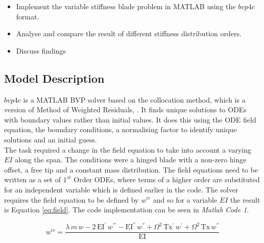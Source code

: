 \documentclass[11pt]{article}
\newcommand*{\lstconsolas}{\fontfamily{Consolas}\selectfont}
\begin{document}
\begin{itemize}
\itemsep0em
    \item Implement the variable stiffness blade problem in MATLAB using the $bvp4c$ format.
    \item Analyse and compare the result of different stiffness distribution orders.
    \item Discuss findings
\end{itemize}

\subsection{Model Description}
$bvp4c$ is a MATLAB BVP solver based on the collocation method, which is a version of Method of Weighted Residuals, \cite{bvp}. It finds unique solutions to ODEs with boundary values rather than initial values. It does this using the ODE field equation, the boundary conditions, a normalising factor to identify unique solutions and an initial guess.\\
The task required a change in the field equation to take into account a varying $EI$ along the span. The conditions were a hinged blade with a non-zero hinge offset, a free tip and a constant mass distribution.
The field equations need to be written as a set of $1^{st}$ Order ODEs, where terms of a higher order are substituted for an independent variable which is defined earlier in the code.
The solver requires the field equation to be defined by $w^{iv}$ and so for a variable $EI$ the result is Equation \ref{eq:field}. The code implementation can be seen in \textit{Matlab Code 1}.

\begin{equation}
    w^{iv}=\frac{\lambda \,m\,w-2\,\mathrm{EI^{'}}\,w^{'''}-\mathrm{EI^{''}}\,w^{''}+\Omega ^2\,\mathrm{Tx^{'}}\,w^{'}+\Omega ^2\,\mathrm{Tx}\,w^{''}}{\mathrm{EI}} \label{eq:field}
\end{equation}{}
\vspace{-1cm}

\end{document}
